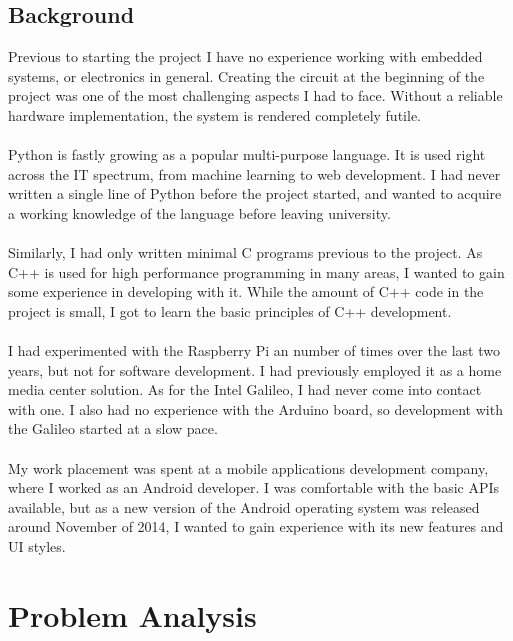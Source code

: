 \documentclass{article}
\begin{document}
\subsection{Background}
Previous to starting the project I have no experience working with embedded systems, or electronics in general. Creating the circuit at the beginning of the project was one of the most challenging aspects I had to face. Without a reliable hardware implementation, the system is rendered completely futile.\\\\
Python is fastly growing as a popular multi-purpose language. It is used right across the IT spectrum, from machine learning to web development. I had never written a single line of Python before the project started, and wanted to acquire a working knowledge of the language before leaving university. \\\\
Similarly, I had only written minimal C programs previous to the project. As C++ is used for high performance programming in many areas, I wanted to gain some experience in developing with it. While the amount of C++ code in the project is small, I got to learn the basic principles of C++ development. \\\\
I had experimented with the Raspberry Pi an number of times over the last two years, but not for software development. I had previously employed it as a home media center solution. As for the Intel Galileo, I had never come into contact with one. I also had no experience with the Arduino board, so development with the Galileo started at a slow pace.  \\\\
My work placement was spent at a mobile applications development company, where I worked as an Android developer. I was comfortable with the basic APIs available, but as a new version of the Android operating system was released around November of 2014, I wanted to gain experience with its new features and UI styles. 

\section{Problem Analysis}
\end{document}
